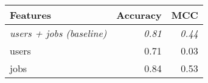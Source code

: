 \begin{tabular}{lrr}
\toprule
\textbf{Features}      & \textbf{Accuracy} & \textbf{MCC}  \\
\midrule
\textit{users + jobs (baseline)}& \textit{0.81}   & \textit{0.44}    \\
users   & 0.71  & 0.03 \\
jobs    & 0.84  & 0.53 \\ 
\bottomrule
\end{tabular}
